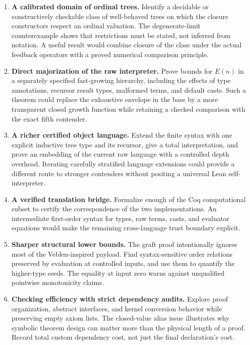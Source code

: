 \documentclass[11pt,letterpaper]{article}
\theoremstyle{definition}
\begin{document}
\begin{enumerate}
\item \textbf{A calibrated domain of ordinal trees.} Identify a decidable or
constructively checkable class of well-behaved trees on which the closure
constructors respect an ordinal valuation. The degenerate-limit counterexample
shows that restrictions must be stated, not inferred from notation. A useful
result would combine closure of the class under the actual feedback operators
with a proved numerical comparison principle.
\item \textbf{Direct majorization of the raw interpreter.} Prove bounds for
\(E(n)\) in a separately specified fast-growing hierarchy, including the effects
of type annotations, recursor result types, malformed terms, and default
casts. Such a theorem could replace the exhaustive envelope in the base by a
more transparent closed growth function while retaining a checked comparison
with the exact fifth contender.
\item \textbf{A richer certified object language.} Extend the finite syntax
with one explicit inductive tree type and its recursor, give a total
interpretation, and prove an embedding of the current raw language with a
controlled depth overhead. Iterating carefully stratified language extensions
could provide a different route to stronger contenders without positing a
universal Lean self-interpreter.
\item \textbf{A verified translation bridge.} Formalize enough of the Coq
computational subset to certify the correspondence of the two implementations.
An intermediate first-order syntax for types, raw terms, casts, and evaluator
equations would make the remaining cross-language trust boundary explicit.
\item \textbf{Sharper structural lower bounds.} The graft proof intentionally
ignores most of the Veblen-inspired payload. Find syntax-sensitive order
relations preserved by evaluation at controlled inputs, and use them to
quantify the higher-type seeds. The equality at input zero warns against
unqualified pointwise monotonicity claims.
\item \textbf{Checking efficiency with strict dependency audits.} Explore
proof organization, abstract interfaces, and kernel conversion behavior while
preserving empty axiom lists. The closed-value alias issue illustrates why
symbolic theorem design can matter more than the physical length of a proof.
Record total custom dependency cost, not just the final declaration's cost.
\end{enumerate}
\end{document}
